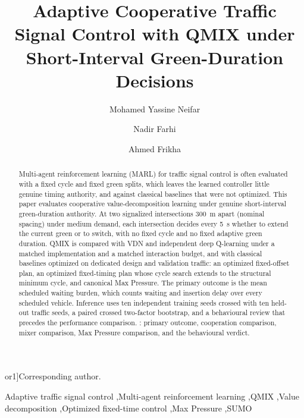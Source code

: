 \documentclass[review,12pt]{elsarticle}
\def\corref#1{}%
\def\cortext#1#2{}%
\def\ead#1{}%
\newcommand{\TBD}[1]{\textcolor{red}{\texttt{\detokenize{#1}}}}
\begin{document}
\hypersetup{pageanchor=false}
\begin{frontmatter}

\title{Adaptive Cooperative Traffic Signal Control with QMIX under Short-Interval Green-Duration Decisions}

\author[inst1]{Mohamed Yassine Neifar\corref{cor1}}
\ead{yessine.neifar.imsil@isgis.usf.tn}
\cortext[cor1]{Corresponding author.}
\author[inst1]{Nadir Farhi}
\author[inst2]{Ahmed Frikha}
\address[inst1]{Universit\'e Gustave Eiffel, COSYS--GRETTIA,
14--20 Boulevard Newton, Cit\'e Descartes, Champs-sur-Marne,
F-77447 Marne-la-Vall\'ee Cedex 2, France}
\address[inst2]{Institut Sup\'erieur de Gestion Industrielle de Sfax,
OLID, University of Sfax, Route de l'A\'eroport km 4, BP 1099,
Sfax 3038, Tunisia}

\begin{abstract}
Multi-agent reinforcement learning (MARL) for traffic signal control is
often evaluated with a fixed cycle and fixed green splits, which leaves
the learned controller little genuine timing authority, and against
classical baselines that were not optimized. This paper evaluates
cooperative value-decomposition learning under genuine short-interval
green-duration authority. At two signalized intersections 300~m apart
(nominal spacing) under medium demand, each intersection decides every
5~s whether to extend the current green or to switch, with no fixed
cycle and no fixed adaptive green duration. QMIX is compared with VDN
and independent deep Q-learning under a matched implementation and a
matched interaction budget, and with classical baselines
optimized on dedicated design and validation traffic: an optimized
fixed-offset plan, an optimized fixed-timing plan whose cycle search
extends to the structural minimum cycle, and canonical Max Pressure.
The primary outcome is the mean scheduled waiting burden, which counts
waiting and insertion delay over every scheduled vehicle. Inference
uses ten independent training seeds crossed with ten held-out traffic
seeds, a paired crossed two-factor bootstrap, and a behavioural review
that precedes the performance comparison.
\TBD{TBD_AFTER_FINAL_EVALUATION}: primary outcome, cooperation
comparison, mixer comparison, Max Pressure comparison, and the
behavioural verdict.
\end{abstract}

\begin{keyword}
Adaptive traffic signal control \sep Multi-agent reinforcement learning
\sep QMIX \sep Value decomposition \sep Optimized fixed-time control
\sep Max Pressure \sep SUMO
\end{keyword}

\end{frontmatter}
\hypersetup{pageanchor=true}
\end{document}
